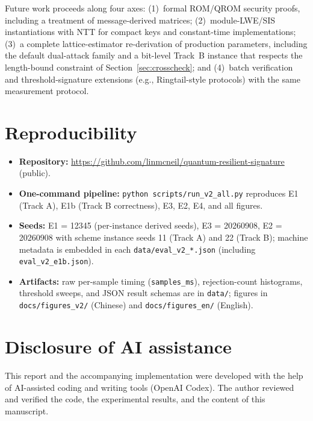 \documentclass[11pt]{article}
\begin{document}
Future work proceeds along four axes: (1)~formal ROM/QROM security proofs,
including a treatment of message-derived matrices; (2)~module-LWE/SIS
instantiations with NTT for compact keys and constant-time implementations;
(3)~a complete lattice-estimator re-derivation of production parameters,
including the default dual-attack family and a bit-level Track~B instance
that respects the length-bound constraint of Section~\ref{sec:crosscheck};
and
(4)~batch verification and threshold-signature extensions (e.g.,
Ringtail-style protocols) with the same measurement protocol.

\section*{Reproducibility}
\begin{itemize}
\item \textbf{Repository:}
  \url{https://github.com/linmcneil/quantum-resilient-signature} (public).
\item \textbf{One-command pipeline:} \texttt{python scripts/run\_v2\_all.py}
  reproduces E1 (Track A), E1b (Track B correctness), E3, E2, E4, and all figures.
\item \textbf{Seeds:} E1 = 12345 (per-instance derived seeds), E3 = 20260908,
  E2 = 20260908 with scheme instance seeds 11 (Track A) and 22 (Track B);
  machine metadata is embedded in each \texttt{data/eval\_v2\_*.json} (including \texttt{eval\_v2\_e1b.json}).
\item \textbf{Artifacts:} raw per-sample timing (\texttt{samples\_ms}),
  rejection-count histograms, threshold sweeps, and JSON result schemas are in
  \texttt{data/}; figures in \texttt{docs/figures\_v2/} (Chinese) and
  \texttt{docs/figures\_en/} (English).
\end{itemize}

\section*{Disclosure of AI assistance}
This report and the accompanying implementation were developed with
the help of AI-assisted coding and writing tools (OpenAI Codex).  The
author reviewed and verified the code, the experimental results, and
the content of this manuscript.



\end{document}
